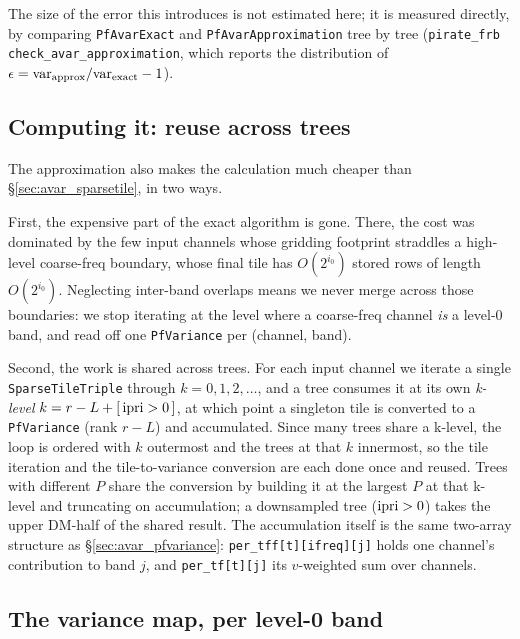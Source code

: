 \documentclass{article}
\numberwithin{equation}{section}   %
\begin{document}
The size of the error this introduces is not estimated here; it is measured directly, by
comparing {\tt PfAvarExact} and {\tt PfAvarApproximation} tree by tree
(\verb|pirate_frb check_avar_approximation|, which reports the distribution of
$\epsilon = {\rm var}_{\rm approx}/{\rm var}_{\rm exact} - 1$).

\subsection{Computing it: reuse across trees}
\label{ssec:approx_algorithm}

The approximation also makes the calculation much cheaper than
\S\ref{sec:avar_sparsetile}, in two ways.

First, the expensive part of the exact algorithm is gone. There, the cost was dominated by the
few input channels whose gridding footprint straddles a high-level coarse-freq boundary, whose
final tile has $O(2^{i_0})$ stored rows of length $O(2^{i_0})$. Neglecting inter-band overlaps
means we never merge across those boundaries: we stop iterating at the level where a coarse-freq
channel {\em is} a level-0 band, and read off one {\tt PfVariance} per (channel, band).

Second, the work is shared across trees. For each input channel we iterate a single
{\tt SparseTileTriple} through $k = 0, 1, 2, \ldots$, and a tree consumes it at its own
{\em k-level} $k = r - L + [\,{\rm ipri} > 0\,]$, at which point a singleton tile is converted to
a {\tt PfVariance} (rank $r-L$) and accumulated. Since many trees share a k-level, the loop is
ordered with $k$ outermost and the trees at that $k$ innermost, so the tile iteration and the
tile-to-variance conversion are each done once and reused. Trees with different $P$ share the
conversion by building it at the largest $P$ at that k-level and truncating on accumulation; a
downsampled tree (${\rm ipri} > 0$) takes the upper DM-half of the shared result.
The accumulation itself is the same two-array structure as \S\ref{sec:avar_pfvariance}:
{\tt per\_tff[t][ifreq][j]} holds one channel's contribution to band $j$, and
{\tt per\_tf[t][j]} its $v$-weighted sum over channels.

\subsection{The variance map, per level-0 band}
\label{ssec:approx_map}
\end{document}
